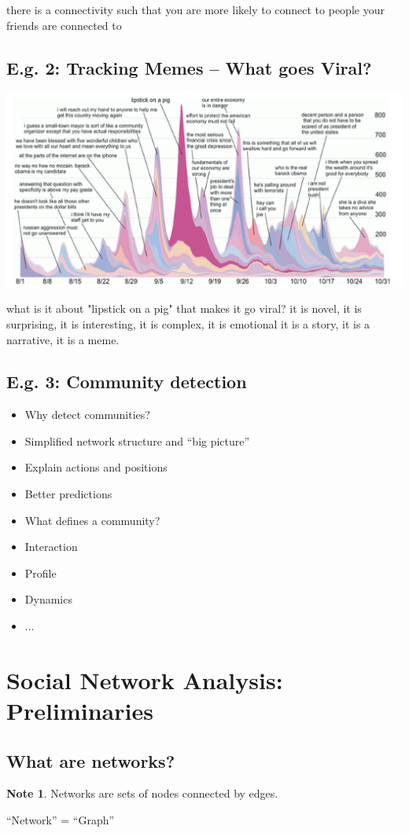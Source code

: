 \documentclass[11pt]{article}
\theoremstyle{definition}
\newtheorem{note}{Note}
\begin{document}
there is a connectivity such that you are more likely to connect to 
people your friends are connected to

\subsection{E.g. 2: Tracking Memes – What goes Viral?}
\includegraphics[width=\textwidth]{5.png}

what is it about "lipstick on a pig" that makes it go viral?
it is novel, it is surprising, it is interesting, it is complex, it is emotional
it is a story, it is a narrative, it is a meme.


\subsection{E.g. 3: Community detection}
\begin{itemize}
    \item Why detect communities?
    \item Simplified network structure and “big picture”
    \item Explain actions and positions
    \item Better predictions
    \item What defines a community?
    \item Interaction
    \item Profile
    \item Dynamics
    \item ...
\end{itemize}

\section{Social Network Analysis:
Preliminaries}
\subsection{What are networks?}
\begin{note}
    Networks are sets of nodes
    connected by edges.
\end{note}
“Network” = “Graph”
\end{document}
